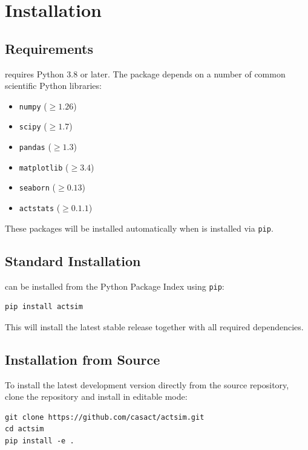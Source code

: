 \chapter{Installation}
\label{chap:installation}

\section{Requirements}

\actsim requires Python 3.8 or later. The package depends on a number of
common scientific Python libraries:

\begin{itemize}[leftmargin=*]
    \item \texttt{numpy} ($\geq 1.26$)
    \item \texttt{scipy} ($\geq 1.7$)
    \item \texttt{pandas} ($\geq 1.3$)
    \item \texttt{matplotlib} ($\geq 3.4$)
    \item \texttt{seaborn} ($\geq 0.13$)
    \item \texttt{actstats} ($\geq 0.1.1$)
\end{itemize}

These packages will be installed automatically when \actsim is installed
via \texttt{pip}.

\section{Standard Installation}

\actsim can be installed from the Python Package Index using \texttt{pip}:

\begin{lstlisting}[style=bashstyle]
pip install actsim
\end{lstlisting}

This will install the latest stable release together with all required
dependencies.

\section{Installation from Source}

To install the latest development version directly from the source
repository, clone the repository and install in editable mode:

\begin{lstlisting}[style=bashstyle]
git clone https://github.com/casact/actsim.git
cd actsim
pip install -e .
\end{lstlisting}


